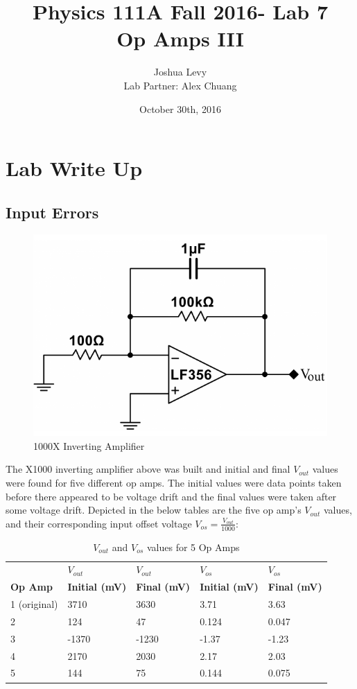 \documentclass{article}
\title{Physics 111A Fall 2016- Lab 7\\
Op Amps III}
\author{Joshua Levy\\Lab Partner: Alex Chuang}
\date{October 30th, 2016}
\begin{document}
\maketitle

\section{Lab Write Up}
\subsection{Input Errors}
    \begin{figure}[H]
        \centering
        \includegraphics[scale = 0.5]{1.png}
        \caption{1000X Inverting Amplifier \cite{lab8}}
        \label{fig:my_label}
    \end{figure}
    The X1000 inverting amplifier above was built and initial and final $V_{out}$ values were found for five different op amps. The initial values were data points taken before there appeared to be voltage drift and the final values were taken after some voltage drift. Depicted in the below tables are the five op amp's $V_{out}$ values, and their corresponding input offset voltage $V_{os} = \frac{V_{out}}{1000}$:
    \begin{table}[H]
        \centering
        \caption{$V_{out}$ and $V_{os}$ values for 5 Op Amps}
        \label{my-label}
        \begin{tabular}{lllll}
        \textbf{} & \textbf{$V_{out}$} & \textbf{$V_{out}$} & \textbf{$V_{os}$} & \textbf{$V_{os}$} \\
        \textbf{Op Amp} & \textbf{Initial (mV)} & \textbf{Final (mV)} & \textbf{Initial (mV)} & \textbf{Final (mV)} \\ \hline
        1 (original) & 3710 & 3630 & 3.71 & 3.63 \\
        2 & 124 & 47 & 0.124 & 0.047 \\
        3 & -1370 & -1230 & -1.37 & -1.23 \\
        4 & 2170 & 2030 & 2.17 & 2.03 \\
        5 & 144 & 75 & 0.144 & 0.075
        \end{tabular}
        \end{table}
\end{document}
